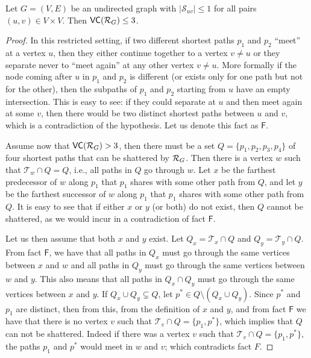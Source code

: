 \begin{lemma}\label{lem:vcdimuppboundunique}
  Let $G=(V,E)$ be an undirected graph with $|\mathcal{S}_{uv}|\le1$ for all
  pairs $(u,v)\in V\times V$. Then $\mathsf{VC}(\mathcal{R}_G)\le 3$.
\end{lemma}

\ifproof
\begin{proof}
  In this restricted setting, if two different shortest paths $p_1$ and $p_2$
  ``meet'' at a vertex $u$, then they either continue together to a vertex
  $v\neq u$ or they separate never to ``meet again'' at any other
  vertex $v\neq u$. More formally if the node coming after $u$ in $p_1$ and
  $p_2$ is different (or exists only for one path but not for the other), then
  the subpaths of $p_1$ and $p_2$ starting from $u$ have an empty intersection.
  This is easy to see: if they could separate at $u$ and then meet again at some
  $v$, then there would be two distinct shortest paths between $u$ and $v$,
  which is a contradiction of the hypothesis. Let us denote this fact as
  $\mathsf{F}$.

  Assume now that $\mathsf{VC}(\mathcal{R}_G)>3$, then there must be a set
  $Q=\{p_1,p_2,p_3,p_4\}$ of four shortest paths that can be shattered by
  $\mathcal{R}_G$. Then there is a vertex $w$ such that $\mathcal{T}_w\cap Q=Q$, i.e.,
  all paths in $Q$ go through $w$. Let $x$ be the farthest predecessor of $w$
  along $p_1$ that $p_1$ shares with some other path from $Q$, and let $y$ be
  the farthest successor of $w$ along $p_1$ that $p_1$ shares with some other
  path from $Q$. It is easy to see that if either $x$ or $y$ (or both) do not
  exist, then $Q$ cannot be shattered, as we would incur in a contradiction of
  fact $\mathsf{F}$.

  Let us then assume that both $x$ and $y$ exist.
  Let $Q_x=\mathcal{T}_x\cap Q$ and $Q_y=\mathcal{T}_y\cap Q$.
  From fact $\mathsf{F}$, we have that all paths in $Q_x$ must go through the
  same vertices between $x$ and $w$ and all paths in $Q_y$ must go through the
  same vertices between $w$ and $y$. This also means that all paths in $Q_x\cap
  Q_y$ must go through the same vertices between $x$ and $y$. If $Q_x\cup
  Q_y\subsetneq Q$, let $p^*\in Q\setminus(Q_x\cup Q_y)$. Since $p^*$ and $p_1$
  are distinct, then from this, from the definition of $x$ and $y$, and from
  fact $\mathsf{F}$ we have that there is no vertex $v$ such that
  $\mathcal{T}_v\cap Q=\{p_1,p^*\}$, which implies that $Q$ can not be
  shattered. Indeed if there was a vertex $v$ such that $\mathcal{T}_v\cap
  Q=\{p_1,p^*\}$, the paths $p_1$ and $p^*$ would meet in $w$ and $v$; which
  contradicts fact $F$.



\end{proof}
